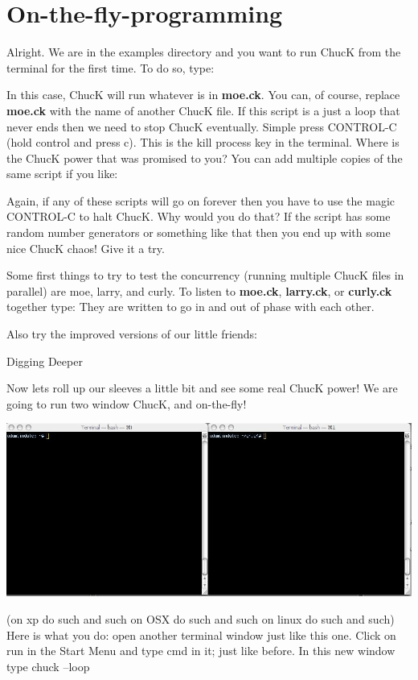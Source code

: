 \section{On-the-fly-programming}

Alright. We are in the examples directory and you want to run ChucK from the terminal for the first time. To do so, type: 

In this case, ChucK will run whatever is in {\bf moe.ck}. You can, of course, replace {\bf moe.ck} with the name of another ChucK file. If this script is a just a loop that never ends then we need to stop ChucK eventually. Simple press CONTROL-C (hold control and press c). This is the kill process key in the terminal. 
Where is the ChucK power that was promised to you? You can add multiple copies of the same script if you like: 

Again, if any of these scripts will go on forever then you have to use the magic CONTROL-C to halt ChucK. Why would you do that? If the script has some random number generators or something like that then you end up with some nice ChucK chaos! Give it a try. 

Some first things to try to test the concurrency (running multiple ChucK files in parallel) are moe, larry, and curly. To listen to {\bf moe.ck}, {\bf larry.ck}, or {\bf curly.ck} together type: They are written to go in and out of phase with each other. 

Also try the improved versions of our little friends: 

Digging Deeper 

Now lets roll up our sleeves a little bit and see some real ChucK power! We are going to run two window ChucK, and on-the-fly! 

\includegraphics[width=\textwidth]{images/2term}

(on xp do such and such on OSX do such and such on linux do such and such)
Here is what you do: open another terminal window just like this one. Click on run in the Start Menu and type cmd in it; just like before. In this new window type chuck --loop    


